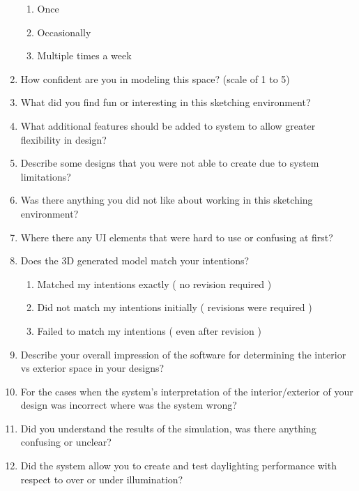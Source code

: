 \documentclass[12pt]{article}
\begin{document}
\begin{enumerate}
      \begin{enumerate}
        \item Once
        \item Occasionally
        \item Multiple times a week
      \end{enumerate}
    \item How confident are you in modeling this space? (scale of 1 to 5)
    \item What did you find fun or interesting in this sketching environment?
    \item What additional features should be added to system to allow greater flexibility in design?
    \item Describe some designs that you were not able to create due  to system limitations?
    \item Was there anything you did not like about working in this sketching environment?
    \item Where there any UI elements that were hard to use or confusing at first?
    \item Does the 3D generated model match your intentions?
      \begin{enumerate}
        \item Matched my intentions exactly ( no revision required )
        \item Did not match my intentions initially ( revisions were required )
        \item Failed to match my intentions ( even after revision )
      \end{enumerate}
    \item Describe your overall impression of the software for determining the interior vs exterior space in your designs?
    \item For the cases when the system’s interpretation of the interior/exterior of your design was incorrect where was the system wrong? 
    \item Did you understand the results of the simulation, was there anything confusing or unclear?
    \item Did the system allow you to create and test daylighting performance with respect to over or under illumination?

  \end{enumerate}
\end{document}
